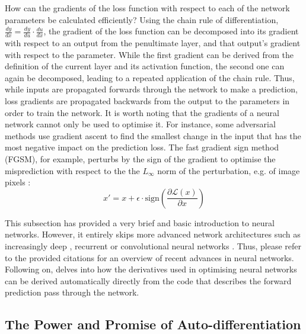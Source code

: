\newpar How can the gradients of the loss function with respect to each of the network parameters be calculated efficiently? Using the chain rule of differentiation, $\frac{dy}{dx} = \frac{dy}{du} \cdot \frac{du}{dx}$, the gradient of the loss function can be decomposed into its gradient with respect to an output from the penultimate layer, and that output's gradient with respect to the parameter. While the first gradient can be derived from the definition of the current layer and its activation function, the second one can again be decomposed, leading to a repeated application of the chain rule. Thus, while inputs are propagated forwards through the network to make a prediction, loss gradients are propagated backwards from the output to the parameters in order to train the network. It is worth noting that the gradients of a neural network cannot only be used to optimise it. For instance, some adversarial methods use gradient ascent to find the smallest change in the input that has the most negative impact on the prediction loss. The fast gradient sign method (FGSM), for example, perturbs by the sign of the gradient to optimise the misprediction with respect to the the $L_{\infty}$ norm of the perturbation, e.g. of image pixels \cite{fast-gradient-2014}:
\begin{equation*}
    x' = x + \epsilon \cdot \text{sign} \left( \frac{\partial \mathcal{L}(x)}{\partial x} \right)
\end{equation*}

\noindent This subsection has provided a very brief and basic introduction to neural networks. However, it entirely skips more advanced network architectures such as increasingly deep \cite{deep-learning-2019}, recurrent \cite{recurrent-nns-2019} or convolutional neural networks \cite{cnn-1990, cnn-review-2022}. Thus, please refer to the provided citations for an overview of recent advances in neural networks. Following on,  delves into how the derivatives used in optimising neural networks can be derived automatically directly from the code that describes the forward prediction pass through the network.

\subsection{The Power and Promise of Auto-differentiation} \label{txt:auto-differentiation}

